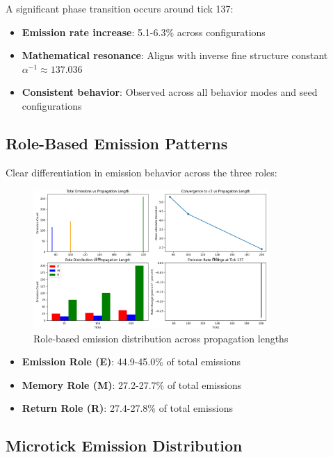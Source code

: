 \documentclass[12pt]{article}
\begin{document}
A significant phase transition occurs around tick 137:

\begin{itemize}
\item \textbf{Emission rate increase}: 5.1-6.3\% across configurations
\item \textbf{Mathematical resonance}: Aligns with inverse fine structure constant $\alpha^{-1} \approx 137.036$
\item \textbf{Consistent behavior}: Observed across all behavior modes and seed configurations
\end{itemize}

\subsection{Role-Based Emission Patterns}

Clear differentiation in emission behavior across the three roles:

\begin{figure}[H]
\centering
\includegraphics[width=0.8\textwidth]{Figure_1.png}
\caption{Role-based emission distribution across propagation lengths}
\end{figure}

\begin{itemize}
\item \textbf{Emission Role (E)}: 44.9-45.0\% of total emissions
\item \textbf{Memory Role (M)}: 27.2-27.7\% of total emissions  
\item \textbf{Return Role (R)}: 27.4-27.8\% of total emissions
\end{itemize}

\subsection{Microtick Emission Distribution}
\end{document}
